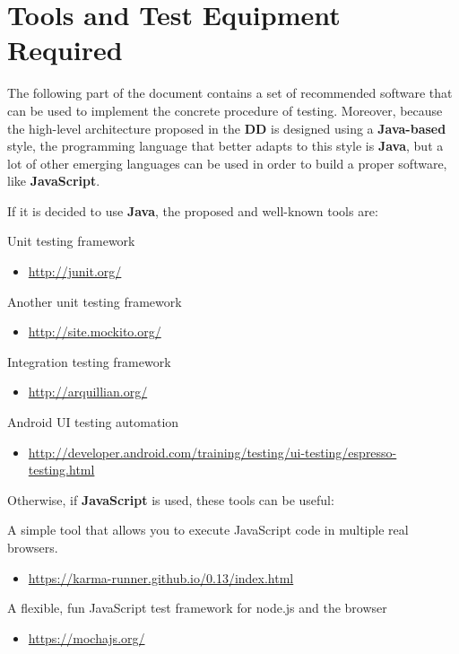 \section{Tools and Test Equipment Required}

The following part of the document contains a set of recommended software that can be used to implement the concrete procedure of testing.
Moreover, because the high-level architecture proposed in the \textbf{DD} is designed using a \textbf{Java-based} style, the programming language that better adapts to this style is \textbf{Java}, but a lot of other emerging languages can be used in order to build a proper software, like \textbf{JavaScript}.\par
If it is decided to use \textbf{Java}, the proposed and well-known tools are:
\begin{itemize}	
	 Unit testing framework
	\begin{itemize}
		\item 
		\href{http://junit.org/}{http://junit.org/}
	\end{itemize}	
	 Another unit testing framework
	\begin{itemize}
		\item 
		\href{http://site.mockito.org/}{http://site.mockito.org/}
	\end{itemize}	
	 Integration testing framework
	\begin{itemize}
		\item \href{http://arquillian.org/}{http://arquillian.org/}
	\end{itemize}
	 Android UI testing automation
	\begin{itemize}
		\item \href{http://developer.android.com/training/testing/ui-testing/espresso-testing.html}{http://developer.android.com/training/testing/ui-testing/espresso-testing.html}
	\end{itemize}
\end{itemize}
Otherwise, if \textbf{JavaScript} is used, these tools can be useful:
\begin{itemize}
	 A simple tool that allows you to execute JavaScript code in multiple real browsers.
	\begin{itemize}
		\item \href{https://karma-runner.github.io/0.13/index.html}{https://karma-runner.github.io/0.13/index.html}
	\end{itemize}
	 A flexible, fun JavaScript test framework for node.js and the browser
	\begin{itemize}
		\item \href{https://mochajs.org/}{https://mochajs.org/}
	\end{itemize}
\end{itemize}
